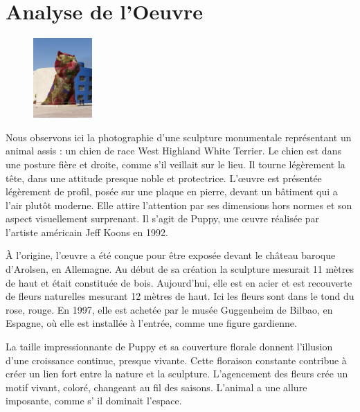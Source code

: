 \documentclass[12pt]{article}
\begin{document}




\section{Analyse de l'Oeuvre}

\begin{figure}
    \centering
    \includegraphics[width=0.2\textwidth]{./images/photo-chien.jpg}
\end{figure}

Nous observons ici la photographie d’une sculpture monumentale représentant un animal assis : un chien de race West Highland White Terrier. Le chien est dans une posture fière et droite, comme s’il veillait sur le lieu. Il tourne légèrement la tête, dans une attitude presque noble et protectrice. L’œuvre est présentée légèrement de profil, posée sur une plaque en pierre, devant un bâtiment qui a l’air plutôt moderne. Elle attire l’attention par ses dimensions hors normes et son aspect visuellement surprenant. Il s'agit de Puppy, une œuvre réalisée par l’artiste américain Jeff Koons en 1992. 

À l’origine, l’œuvre a été conçue pour être exposée devant le château baroque d’Arolsen, en Allemagne. 
Au début de sa création la sculpture mesurait 11 mètres de haut et était constituée de bois. Aujourd’hui, elle est en acier et est recouverte de fleurs naturelles mesurant 12 mètres de haut. Ici les fleurs sont dans le tond du rose, rouge. En 1997, elle est achetée par le musée Guggenheim de Bilbao, en Espagne, où elle est installée à l’entrée, comme une figure gardienne.

La taille impressionnante de Puppy et sa couverture florale donnent l’illusion d’une croissance continue, presque vivante. Cette floraison constante contribue à créer un lien fort entre la nature et la sculpture. L’agencement des fleurs crée un motif vivant, coloré, changeant au fil des saisons. L’animal a une allure imposante, comme s' il dominait l’espace.
\end{document}
